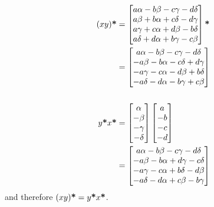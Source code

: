 \documentclass{article}
\begin{document}
\begin{align*}
(xy)\textbf{*} &= \left[\begin{matrix}
a\alpha - b\beta -c\gamma -d\delta\\
a\beta+b\alpha+c\delta-d\gamma\\
a\gamma+c\alpha+d\beta-b\delta\\
a\delta+d\alpha+b\gamma-c\beta
\end{matrix}\right]\textbf{*} \\
&= \left[\begin{matrix}
a\alpha - b\beta -c\gamma -d\delta\\
-a\beta-b\alpha-c\delta+d\gamma\\
-a\gamma-c\alpha-d\beta+b\delta\\
-a\delta-d\alpha-b\gamma+c\beta
\end{matrix}\right]
\\ \\
y\textbf{*} x\textbf{*} &= \left[\begin{matrix}
\alpha\\-\beta\\-\gamma\\-\delta
\end{matrix}\right]\left[\begin{matrix}
a\\-b\\-c\\-d
\end{matrix}\right]\\
&= \left[\begin{matrix}
a\alpha-b\beta-c\gamma-d\delta\\
-a\beta-b\alpha+d\gamma-c\delta\\
-a\gamma-c\alpha+b\delta-d\beta\\
-a\delta-d\alpha+c\beta-b\gamma
\end{matrix}\right]
\end{align*}
and therefore $(xy)\textbf{*} = y\textbf{*} x\textbf{*}$.
\end{document}
